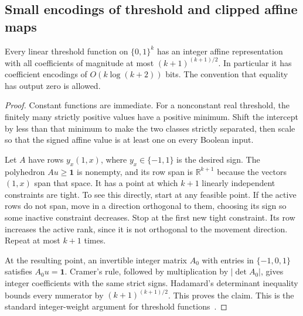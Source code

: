 \subsection{Small encodings of threshold and clipped affine maps}
\begin{lemma}
\label{lem:boolean-integer-threshold}
Every linear threshold function on $\{0,1\}^k$ has an integer affine representation with all coefficients of magnitude at most
$(k+1)^{(k+1)/2}$. In particular it has coefficient encodings of $O(k\log(k+2))$ bits. The convention that equality has output zero is allowed.
\end{lemma}
\begin{proof}
Constant functions are immediate. For a nonconstant real threshold, the finitely many strictly positive values have a positive minimum. Shift the intercept by less than that minimum to make the two classes strictly separated, then scale so that the signed affine value is at least one on every Boolean input.

Let $A$ have rows $y_x(1,x)$, where $y_x\in\{-1,1\}$ is the desired sign. The polyhedron $Au\ge\mathbf1$ is nonempty, and its row span is $\mathbb R^{k+1}$ because the vectors $(1,x)$ span that space. It has a point at which $k+1$ linearly independent constraints are tight. To see this directly, start at any feasible point. If the active rows do not span, move in a direction orthogonal to them, choosing its sign so some inactive constraint decreases. Stop at the first new tight constraint. Its row increases the active rank, since it is not orthogonal to the movement direction. Repeat at most $k+1$ times.

At the resulting point, an invertible integer matrix $A_0$ with entries in $\{-1,0,1\}$ satisfies $A_0u=\mathbf1$. Cramer's rule, followed by multiplication by $|\det A_0|$, gives integer coefficients with the same strict signs. Hadamard's determinant inequality bounds every numerator by $(k+1)^{(k+1)/2}$. This proves the claim. This is the standard integer-weight argument for threshold functions~\cite{muroga}.
\end{proof}

